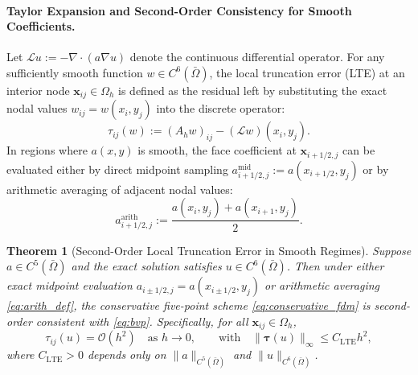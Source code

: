 \documentclass[11pt,a4paper]{article}
\newtheorem{theorem}{Theorem}[section]
\theoremstyle{definition}
\theoremstyle{remark}
\begin{document}
\paragraph{Taylor Expansion and Second-Order Consistency for Smooth Coefficients.}
Let $\mathcal{L}u := -\nabla\cdot(a\nabla u)$ denote the continuous differential operator. For any sufficiently smooth function $w \in C^6(\bar{\Omega})$, the local truncation error (LTE) at an interior node $\bm{x}_{ij} \in \Omega_h$ is defined as the residual left by substituting the exact nodal values $w_{ij} = w(x_i,y_j)$ into the discrete operator:
\begin{equation}
	\tau_{ij}(w) := (A_h w)_{ij} - (\mathcal{L}w)(x_i,y_j).
	\label{eq:lte_def}
\end{equation}
In regions where $a(x,y)$ is smooth, the face coefficient at $\bm{x}_{i+1/2,j}$ can be evaluated either by direct midpoint sampling $a_{i+1/2,j}^{\text{mid}} := a(x_{i+1/2}, y_j)$ or by arithmetic averaging of adjacent nodal values:
\begin{equation}
	a_{i+1/2,j}^{\text{arith}} := \frac{a(x_i, y_j) + a(x_{i+1}, y_j)}{2}.
	\label{eq:arith_def}
\end{equation}

\begin{theorem}[Second-Order Local Truncation Error in Smooth Regimes]
	\label{thm:truncation_smooth}
	Suppose $a \in C^5(\bar{\Omega})$ and the exact solution satisfies $u \in C^6(\bar{\Omega})$. Then under either exact midpoint evaluation $a_{i\pm 1/2,j} = a(x_{i\pm 1/2},y_j)$ or arithmetic averaging \eqref{eq:arith_def}, the conservative five-point scheme \eqref{eq:conservative_fdm} is second-order consistent with \eqref{eq:bvp}. Specifically, for all $\bm{x}_{ij} \in \Omega_h$,
	\begin{equation}
		\tau_{ij}(u) = \mathcal{O}(h^2) \quad \text{as } h \to 0, \qquad \text{with} \quad \|\bm{\tau}(u)\|_\infty \le C_{\text{LTE}} h^2,
		\label{eq:lte_order2}
	\end{equation}
	where $C_{\text{LTE}} > 0$ depends only on $\|a\|_{C^5(\bar{\Omega})}$ and $\|u\|_{C^6(\bar{\Omega})}$.
\end{theorem}
\end{document}
